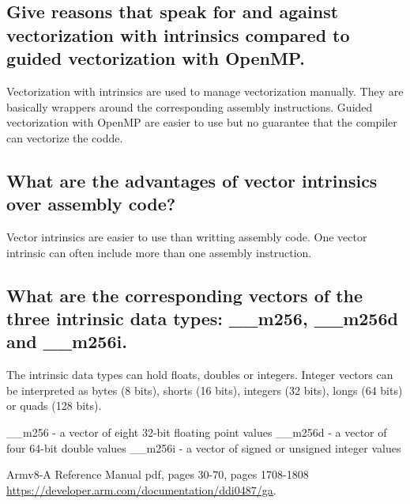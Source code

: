 \documentclass[runningheads]{llncs}
\begin{document}
\subsection{Give reasons that speak for and against vectorization with intrinsics compared to guided vectorization with OpenMP.}
Vectorization with intrinsics are used to manage vectorization manually. They are basically wrappers around the corresponding assembly instructions.
Guided vectorization with OpenMP are easier to use but no guarantee that the compiler can vectorize the codde.

\subsection{What are the advantages of vector intrinsics over assembly code?}
Vector intrinsics are easier to use than writting assembly code. One vector intrinsic can often include more than one
assembly instruction. 

\subsection{What are the corresponding vectors of the three intrinsic data types: \_\_m256, \_\_m256d and \_\_m256i.}
The intrinsic data types can hold floats, doubles or integers. Integer vectors can be interpreted as bytes (8 bits), shorts (16 bits), 
integers (32 bits), longs (64 bits) or quads (128 bits).

\_\_m256 - a vector of eight 32-bit floating point values
\_\_m256d - a vector of four 64-bit double values
\_\_m256i - a vector of signed or unsigned integer values

%
%
%
% 
% 
%
\begin{thebibliography}{8}

Armv8-A Reference Manual pdf, pages 30-70, pages 1708-1808 \\ \url{https://developer.arm.com/documentation/ddi0487/ga}.

\end{thebibliography}
\end{document}
